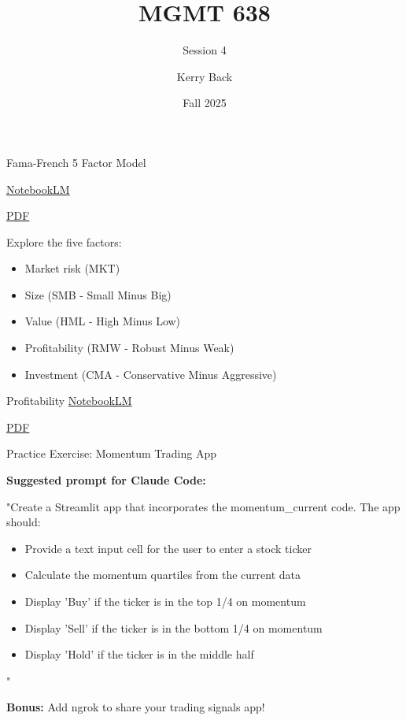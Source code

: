 \documentclass[aspectratio=169]{beamer}
\title{MGMT 638}
\subtitle{Session 4}
\author{Kerry Back}
\institute{}
\date{Fall 2025}
\begin{document}
\maketitle

\begin{frame}{Fama-French 5 Factor Model}

\href{https://notebooklm.google.com/notebook/d954c2ce-ade6-4f8f-a169-6cf20e6c7f92}{NotebookLM}

\vspace{0.5em}

\href{https://mgmt638.kerryback.com/Fama_French_JFE_2015.pdf}{PDF}

\vspace{1em}

Explore the five factors:
\begin{itemize}
    \item Market risk (MKT)
    \item Size (SMB - Small Minus Big)
    \item Value (HML - High Minus Low)
    \item Profitability (RMW - Robust Minus Weak)
    \item Investment (CMA - Conservative Minus Aggressive)
\end{itemize}

\end{frame}

\begin{frame}{Profitability}
\centering
\Large
\href{https://notebooklm.google.com/notebook/5a303502-e158-49bb-bd81-a20c35a00b8d}{NotebookLM}

\vspace{1em}

\href{https://mgmt638.kerryback.com/Novy-Marx_Medhat_2025.pdf}{PDF}

\end{frame}

\begin{frame}{Practice Exercise: Momentum Trading App}

\textbf{Suggested prompt for Claude Code:}

\vspace{1em}

\small
"Create a Streamlit app that incorporates the momentum\_current code. The app should:
\begin{itemize}
    \item Provide a text input cell for the user to enter a stock ticker
    \item Calculate the momentum quartiles from the current data
    \item Display 'Buy' if the ticker is in the top 1/4 on momentum
    \item Display 'Sell' if the ticker is in the bottom 1/4 on momentum
    \item Display 'Hold' if the ticker is in the middle half
\end{itemize}"

\vspace{0.5em}

\normalsize
\textbf{Bonus:} Add ngrok to share your trading signals app!

\end{frame}
\end{document}
